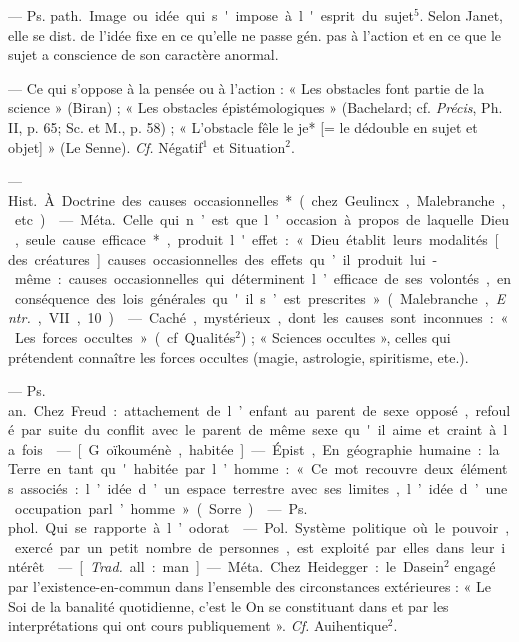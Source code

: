 \begin{itemize}[leftmargin=1cm, label=, itemsep=1pt]
 — \si{Ps. path.} Image ou idée
qui s'impose à l'esprit du sujet$^5$.
Selon Janet, elle se dist. de l’idée
fixe en ce qu’elle ne passe gén. pas à
l’action et en ce que le sujet a conscience de son caractère anormal.

 — Ce qui s'oppose à la
pensée ou à l’action : « Les obstacles
font partie de la science » (Biran) ;
« Les obstacles épistémologiques »
(Bachelard; cf. {\it Précis}, Ph. II, p. 65;
Sc. et M., p. 58) ; « L’obstacle fêle
le je* [= le dédouble en sujet et
objet] » (Le Senne). {\it Cf.} Négatif$^1$ et
Situation$^2$.

 — \si{Hist.} À. Doctrine
des causes occasionnelles* (chez
Geulincx, Malebranche, etc.).

 — \si{Méta.} Celle
qui n’est que l’occasion à propos de
laquelle Dieu, seule cause efficace*,
produit l'effet : « Dieu établit leurs
modalités [des créatures] causes
occasionnelles des effets qu’il produit lui-même : causes occasionnelles qui déterminent l’efficace de
ses volontés, en conséquence des lois
générales qu'il s’est prescrites »
(Malebranche, {\it Entr.}, VII, 10).

 — Caché, mystérieux, dont
les causes sont inconnues : « Les
forces occultes » (cf. Qualités$^2$) ;
« Sciences occultes », celles qui prétendent connaître les forces occultes
(magie, astrologie, spiritisme, ete.).

 — \si{Ps. an.} Chez
Freud : attachement de l’enfant au
parent de sexe opposé, refoulé par
suite du conflit avec le parent de
même sexe qu'il aime et craint à la
fois.

 — [G. oïkouménè, habitée]
— Épist, En géographie humaine :
la Terre en tant qu'habitée par
l’homme : « Ce mot recouvre deux
éléments associés : l’idée d’un
espace terrestre avec ses limites,
l’idée d’une occupation parl’homme »
(Sorre).

 — \si{Ps. phol.} Qui se rapporte
à l’odorat.

 — \si{Pol.} Système politique
où le pouvoir, exercé par un petit
nombre de personnes, est exploité
par elles dans leur intérêt.

 — [{\it Trad.} all. : man] — \si{Méta.} Chez
Heidegger : le Dasein$^2$ engagé par
l’existence-en-commun dans l’ensemble des circonstances extérieures :
« Le Soi de la banalité quotidienne,
c’est le On se constituant dans et
par les interprétations qui ont
cours publiquement ». {\it Cf.} Auihentique$^2$.


\end{itemize}
